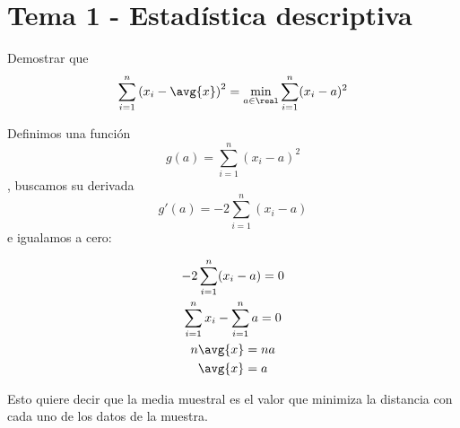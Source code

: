\section{Tema 1 - Estadística descriptiva}

\begin{problem}[2] Demostrar que \[ \sum_{i=1}^n \left(x_i-\avg{x}\right)^2 = \min_{a\in \real} \sum_{i=1}^n(x_i-a)^2 \]

\solution

Definimos una función \[ g(a) = \sum_{i=1}^n(x_i-a)^2 \], buscamos su derivada \[ g'(a) = -2 \sum_{i=1}^n(x_i-a) \] e igualamos a cero:

\begin{gather*}
-2 \sum_{i=1}^n(x_i-a) = 0 \\
\sum_{i=1}^n x_i - \sum_{i=1}^n a = 0 \\
n \avg{x} = n a \\
\avg{x} = a 
\end{gather*}

Esto quiere decir que la media muestral es el valor que minimiza la distancia con cada uno de los datos de la muestra.
\end{problem}

